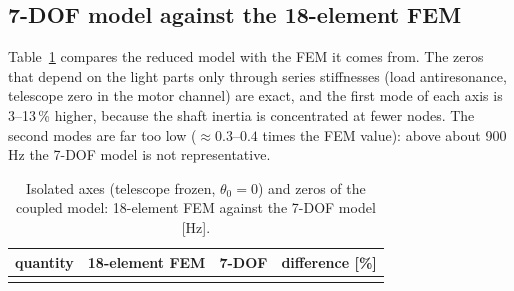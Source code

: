 \documentclass[10pt,a4paper]{article}
\numberwithin{equation}{section}
\begin{document}
\subsection{7-DOF model against the 18-element FEM}\label{subsec:lump_vs_fem7}
Table~\ref{tab:lump_fem7} compares the reduced model with the FEM it comes from. The zeros that depend on the light parts only through series stiffnesses (load antiresonance, telescope zero in the motor channel) are exact, and the first mode of each axis is 3--13\,\% higher, because the shaft inertia is concentrated at fewer nodes. The second modes are far too low ($\approx 0.3$--$0.4$ times the FEM value): above about 900\,Hz the 7-DOF model is not representative.
\begin{table}[H]\centering\small
\caption{Isolated axes (telescope frozen, $\theta_0 = 0$) and zeros of the coupled model: 18-element FEM against the 7-DOF model [Hz].}\label{tab:lump_fem7}
\begin{tabular}{lrrr}\toprule quantity & 18-element FEM & 7-DOF & difference [\%] \\ \midrule
\\ \bottomrule\end{tabular}\end{table}

\end{document}
